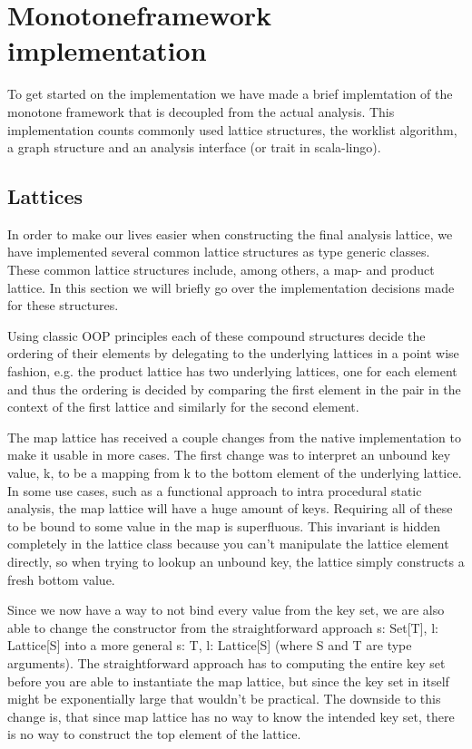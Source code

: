 \chapter{Monotoneframework implementation}

To get started on the implementation we have made a brief implemtation of the monotone framework that is decoupled from the actual analysis.
This implementation counts commonly used lattice structures, the worklist algorithm, a graph structure and an analysis interface (or trait in scala-lingo).

\section{Lattices}

In order to make our lives easier when constructing the final analysis lattice, we have implemented several common lattice structures as type generic classes. These common lattice structures include, among others, a map- and product lattice. In this section we will briefly go over the implementation decisions made for these structures.

Using classic OOP principles each of these compound structures decide the ordering of their elements by delegating to the underlying lattices in a point wise fashion, e.g. the product lattice has two underlying lattices, one for each element and thus the ordering is decided by comparing the first element in the pair in the context of the first lattice and similarly for the second element.

The map lattice has received a couple changes from the native implementation to make it usable in more cases. The first change was to interpret an unbound key value, k, to be a mapping from k to the bottom element of the underlying lattice. In some use cases, such as a functional approach to intra procedural static analysis, the map lattice will have a huge amount of keys. Requiring all of these to be bound to some value in the map is superfluous. This invariant is hidden completely in the lattice class because you can't manipulate the lattice element directly, so when trying to lookup an unbound key, the lattice simply constructs a fresh bottom value.

Since we now have a way to not bind every value from the key set, we are also able to change the constructor from the straightforward approach s: Set[T], l: Lattice[S] into a more general s: T, l: Lattice[S] (where S and T are type arguments). The straightforward approach has to computing the entire key set before you are able to instantiate the map lattice, but since the key set in itself might be exponentially large that wouldn't be practical. The downside to this change is, that since map lattice has no way to know the intended key set, there is no way to construct the top element of the lattice.


